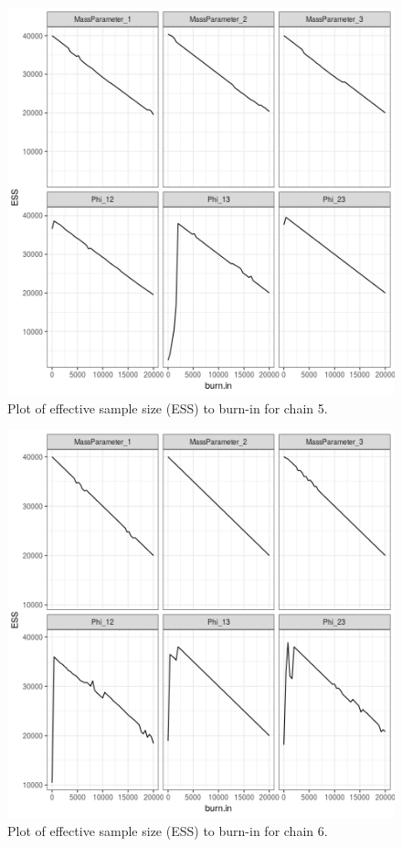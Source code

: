 \documentclass[12pt]{article} %
\begin{document}
\newpage

\begin{figure}[h]
	\centering
	\includegraphics[scale=0.65]{Images/Gen_data/Case_2/Esimated_burn_in_plot_5.png}
	\caption{Plot of effective sample size (ESS) to burn-in for chain 5.}
	\label{fig:case_2_esimated_burn_in_plot_5}
\end{figure}

\newpage

\begin{figure}[h]
	\centering
	\includegraphics[scale=0.65]{Images/Gen_data/Case_2/Esimated_burn_in_plot_6.png}
	\caption{Plot of effective sample size (ESS) to burn-in for chain 6.}
	\label{fig:case_2_esimated_burn_in_plot_6}
\end{figure}
\end{document}
